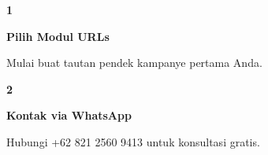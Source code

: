 \documentclass[a4paper]{article}
\begin{document}
\begin{center}
\begin{minipage}[t]{0.318\textwidth}
    \colorbox{BlueBg}{%
        \begin{minipage}{\dimexpr\linewidth-2\fboxsep\relax}
            \vspace{6pt}
            \begin{center}
                {\fontsize{22}{26}\selectfont\bfseries\color{BluePrimary} 1}
            \end{center}
            \vspace{2pt}
            \begin{center}
                {\fontsize{10}{13}\selectfont\bfseries\color{BlueDark} Pilih Modul URLs}\par\vspace{3pt}
                {\fontsize{9}{12}\selectfont\color{TextDark} Mulai buat tautan pendek kampanye pertama Anda.}
            \end{center}
            \vspace{6pt}
        \end{minipage}}
\end{minipage}%
\hfill
\begin{minipage}[t]{0.318\textwidth}
    \colorbox{BlueBg}{%
        \begin{minipage}{\dimexpr\linewidth-2\fboxsep\relax}
            \vspace{6pt}
            \begin{center}
                {\fontsize{22}{26}\selectfont\bfseries\color{BluePrimary} 2}
            \end{center}
            \vspace{2pt}
            \begin{center}
                {\fontsize{10}{13}\selectfont\bfseries\color{BlueDark} Kontak via WhatsApp}\par\vspace{3pt}
                {\fontsize{9}{12}\selectfont\color{TextDark} Hubungi +62 821 2560 9413 untuk konsultasi gratis.}
            \end{center}
            \vspace{6pt}
        \end{minipage}}
\end{minipage}%
\hfill
\begin{minipage}[t]{0.318\textwidth}
    \colorbox{BlueBg}{%
        \begin{minipage}{\dimexpr\linewidth-2\fboxsep\relax}
            \vspace{6pt}

\end{minipage}}
\end{minipage}
\end{center}
\end{document}
